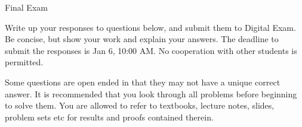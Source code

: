 \documentclass{article}
\newif\ifsolutions
\begin{document}
	
\ifsolutions\else

\fi

\begin{center}
	{\Huge Final Exam
	\ifsolutions (with Solutions) \fi}
\end{center}
\bigskip

\ifsolutions
The solutions below are meant to explain a possible way to solve the given problems and provide the final answer. They are not meant to present an answer that would receive maximal grade for each question.
\else
Write up your responses to questions below, and submit them to Digital Exam. Be concise, but show your work and explain your answers. The deadline to submit the responses is Jan 6, 10:00 AM. No cooperation with other students is permitted.

Some questions are open ended in that they may not have a unique correct answer. 
It is recommended that you look through all problems before beginning to solve them.
You are allowed to refer to textbooks, lecture notes, slides, problem sets etc for results and proofs contained therein.
\fi


\end{document}
